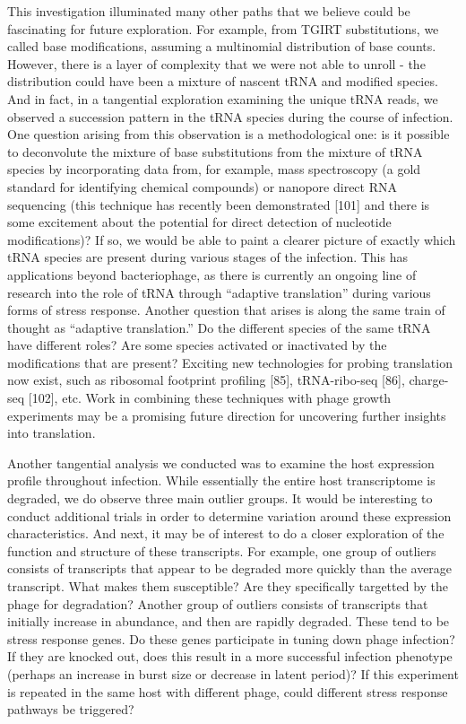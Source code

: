 \documentclass[12pt,twoside]{mitthesis-manusdown}
\begin{document}
This investigation illuminated many other paths that we believe could be
fascinating for future exploration. For example, from TGIRT
substitutions, we called base modifications, assuming a multinomial
distribution of base counts. However, there is a layer of complexity
that we were not able to unroll - the distribution could have been a
mixture of nascent tRNA and modified species. And in fact, in a
tangential exploration examining the unique tRNA reads, we observed a
succession pattern in the tRNA species during the course of infection.
One question arising from this observation is a methodological one: is
it possible to deconvolute the mixture of base substitutions from the
mixture of tRNA species by incorporating data from, for example, mass
spectroscopy (a gold standard for identifying chemical compounds) or
nanopore direct RNA sequencing (this technique has recently been
demonstrated {[}101{]} and there is some excitement about the potential
for direct detection of nucleotide modifications)? If so, we would be
able to paint a clearer picture of exactly which tRNA species are
present during various stages of the infection. This has applications
beyond bacteriophage, as there is currently an ongoing line of research
into the role of tRNA through ``adaptive translation'' during various
forms of stress response. Another question that arises is along the same
train of thought as ``adaptive translation.'' Do the different species
of the same tRNA have different roles? Are some species activated or
inactivated by the modifications that are present? Exciting new
technologies for probing translation now exist, such as ribosomal
footprint profiling {[}85{]}, tRNA-ribo-seq {[}86{]}, charge-seq
{[}102{]}, etc. Work in combining these techniques with phage growth
experiments may be a promising future direction for uncovering further
insights into translation.

Another tangential analysis we conducted was to examine the host
expression profile throughout infection. While essentially the entire
host transcriptome is degraded, we do observe three main outlier groups.
It would be interesting to conduct additional trials in order to
determine variation around these expression characteristics. And next,
it may be of interest to do a closer exploration of the function and
structure of these transcripts. For example, one group of outliers
consists of transcripts that appear to be degraded more quickly than the
average transcript. What makes them susceptible? Are they specifically
targetted by the phage for degradation? Another group of outliers
consists of transcripts that initially increase in abundance, and then
are rapidly degraded. These tend to be stress response genes. Do these
genes participate in tuning down phage infection? If they are knocked
out, does this result in a more successful infection phenotype (perhaps
an increase in burst size or decrease in latent period)? If this
experiment is repeated in the same host with different phage, could
different stress response pathways be triggered?
\end{document}
